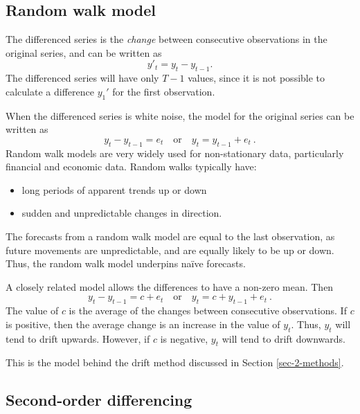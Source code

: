 \documentclass[]{book}
\providecommand{\tightlist}{%
  \setlength{\itemsep}{0pt}\setlength{\parskip}{0pt}}
\begin{document}
\hypertarget{random-walk-model}{%
\subsection*{Random walk model}\label{random-walk-model}}

The differenced series is the \emph{change} between consecutive observations in the original series, and can be written as
\[
  y'_t = y_t - y_{t-1}.
\]
The differenced series will have only \(T-1\) values, since it is not possible to calculate a difference \(y_1'\) for the first observation.

When the differenced series is white noise, the model for the original series can be written as
\[
  y_t - y_{t-1} = e_t \quad\text{or}\quad {y_t = y_{t-1} + e_t}\: .
\]
Random walk models are very widely used for non-stationary data, particularly financial and economic data. Random walks typically have:

\begin{itemize}
\tightlist
\item
  long periods of apparent trends up or down
\item
  sudden and unpredictable changes in direction.
\end{itemize}

The forecasts from a random walk model are equal to the last observation, as future movements are unpredictable, and are equally likely to be up or down. Thus, the random walk model underpins naïve forecasts.

A closely related model allows the differences to have a non-zero mean. Then
\[
  y_t - y_{t-1} = c + e_t\quad\text{or}\quad {y_t = c + y_{t-1} + e_t}\: .
\]
The value of \(c\) is the average of the changes between consecutive observations. If \(c\) is positive, then the average change is an increase in the value of \(y_t\). Thus, \(y_t\) will tend to drift upwards. However, if \(c\) is negative, \(y_t\) will tend to drift downwards.

This is the model behind the drift method discussed in Section \ref{sec-2-methods}.

\hypertarget{second-order-differencing}{%
\subsection*{Second-order differencing}\label{second-order-differencing}}
\end{document}
